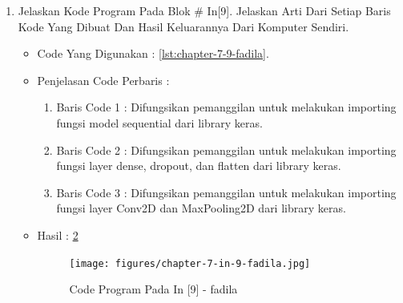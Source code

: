 \begin{enumerate}
\begin{itemize}
\begin{enumerate}
\item Baris Code 6	: Mencetak dan menampilkan hasil dari variabel num\_classes menggunakan perintah print
\end{enumerate}
\item Hasil : \ref{chapter-7-in-8-fadila}
\par
\par
\begin{figure}[!hbtp]
\centering
\texttt{[image: figures/chapter-7-in-8-fadila.jpg]}
\caption{Code Program Pada In [8] - fadila}
\label{chapter-7-in-8-fadila}
\end{figure}
\par
\par
\end{itemize}
\par
\par
\par
\item Jelaskan Kode Program Pada Blok \# In[9]. Jelaskan Arti Dari Setiap Baris Kode Yang Dibuat Dan Hasil Keluarannya Dari Komputer Sendiri.
\begin{itemize}
\item Code Yang Digunakan : \ref{lst:chapter-7-9-fadila}.

\par
\par
\item Penjelasan Code Perbaris	: 
\begin{enumerate}
\item Baris Code 1	: Difungsikan pemanggilan untuk melakukan importing fungsi model sequential dari library keras.
\item Baris Code 2	: Difungsikan pemanggilan untuk melakukan importing fungsi layer dense, dropout, dan flatten dari library keras.
\item Baris Code 3	: Difungsikan pemanggilan untuk  melakukan importing fungsi layer Conv2D dan MaxPooling2D dari library keras.
\end{enumerate}
\par
\item Hasil : \ref{chapter-7-in-9-fadila}
\par
\par
\begin{figure}[!hbtp]
\centering
\texttt{[image: figures/chapter-7-in-9-fadila.jpg]}
\caption{Code Program Pada In [9] - fadila}
\label{chapter-7-in-9-fadila}
\end{figure}

\end{itemize}
\end{enumerate}
